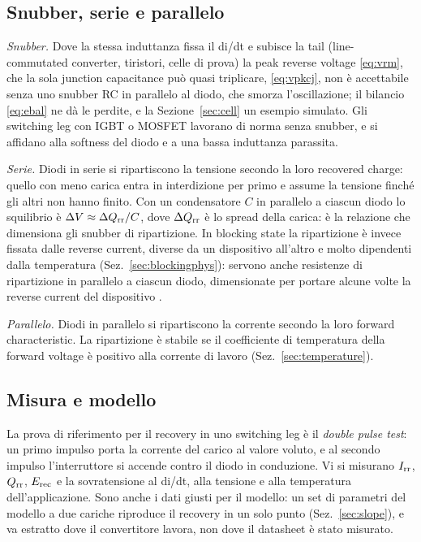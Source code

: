\documentclass[10pt,a4paper]{scrartcl}
\let\newcommand\pdvaluedefine
\newcommand{\Irr}{I_\mathrm{rr}}
\newcommand{\Qrr}{Q_\mathrm{rr}}
\newcommand{\Erec}{E_\mathrm{rec}}
\begin{document}
\subsection{Snubber, serie e parallelo}
\emph{Snubber.} Dove la stessa induttanza fissa il di/dt e subisce la tail (line-commutated converter, tiristori, celle di prova) la peak reverse voltage \eqref{eq:vrm}, che la sola junction capacitance può quasi triplicare, \eqref{eq:vpkcj}, non è accettabile senza uno snubber RC in parallelo al diodo, che smorza l'oscillazione; il bilancio \eqref{eq:ebal} ne dà le perdite, e la Sezione~\ref{sec:cell} un esempio simulato. Gli switching leg con IGBT o MOSFET lavorano di norma senza snubber, e si affidano alla softness del diodo e a una bassa induttanza parassita.

\emph{Serie.} Diodi in serie si ripartiscono la tensione secondo la loro recovered charge: quello con meno carica entra in interdizione per primo e assume la tensione finché gli altri non hanno finito. Con un condensatore $C$ in parallelo a ciascun diodo lo squilibrio è $\Delta V \approx \Delta\Qrr/C$, dove $\Delta\Qrr$ è lo spread della carica: è la relazione che dimensiona gli snubber di ripartizione. In blocking state la ripartizione è invece fissata dalle reverse current, diverse da un dispositivo all'altro e molto dipendenti dalla temperatura (Sez.~\ref{sec:blockingphys}): servono anche resistenze di ripartizione in parallelo a ciascun diodo, dimensionate per portare alcune volte la reverse current del dispositivo \cite{dynexan6531,stan443}.

\emph{Parallelo.} Diodi in parallelo si ripartiscono la corrente secondo la loro forward characteristic. La ripartizione è stabile se il coefficiente di temperatura della forward voltage è positivo alla corrente di lavoro (Sez.~\ref{sec:temperature}).

\subsection{Misura e modello}
La prova di riferimento per il recovery in uno switching leg è il \emph{double pulse test}: un primo impulso porta la corrente del carico al valore voluto, e al secondo impulso l'interruttore si accende contro il diodo in conduzione. Vi si misurano $\Irr$, $\Qrr$, $\Erec$ e la sovratensione al di/dt, alla tensione e alla temperatura dell'applicazione. Sono anche i dati giusti per il modello: un set di parametri del modello a due cariche riproduce il recovery in un solo punto (Sez.~\ref{sec:slope}), e va estratto dove il convertitore lavora, non dove il datasheet è stato misurato.
\end{document}

